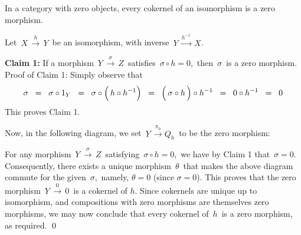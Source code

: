 
\vskip 0.5cm
\begin{lemma}\label{CokernelOfAnIsomorphismIsZero}
\mbox{}
\vskip 0.1cm
\noindent
In a category with zero objects, every cokernel of an isomorphism is a zero morphism.
\end{lemma}
\proof
Let
\,$X \,\overset{h}{\longrightarrow}\, Y$\,
be an isomorphism, with inverse
\,$Y \,\overset{h^{-1}}{\longrightarrow}\, X$.\,

\vskip 0.4cm
\noindent
\textbf{Claim 1:}\quad
If a morphism \,$Y \,\overset{\sigma}{\longrightarrow}\, Z$\, satisfies \,$\sigma \circ h = 0$,\,
then \,$\sigma$\, is a zero morphism.
\vskip 0.2cm
\noindent
Proof of Claim 1:\;\;
Simply observe that
\begin{equation*}
\sigma
\;\; = \;\;
	\sigma \circ 1_{Y}
\;\; = \;\;
	\sigma \circ \left(\,h \overset{{\color{white}!}}{\circ} h^{-1}\right)
\;\; = \;\;
	 \left(\, \sigma \overset{{\color{white}!}}{\circ} h \,\right) \circ h^{-1}
\;\; = \;\;
	 0 \circ h^{-1}
\;\; = \;\;
	 0
\end{equation*}
This proves Claim 1.

\vskip 0.4cm
\noindent
Now, in the following diagram, we set
\,$Y \,\overset{\pi_{h}}{\longrightarrow} Q_{h}$\,
to be the zero morphism:
\begin{center}
\end{center}
For any morphism
\,$Y \,\overset{\sigma}{\longrightarrow}\, Z$\, satisfying \,$\sigma \circ h = 0$,\,
we have by Claim 1 that \,$\sigma = 0$.
Consequently, there exists a unique morphism \,$\theta$\, that makes the above diagram
commute for the given \,$\sigma$,\, namely, $\theta = 0$ (since $\sigma = 0$).
This proves that the zero morphism \,$Y \,\overset{0}{\longrightarrow}\, 0$\, is a cokernel of $h$.
Since cokernels are unique up to isomorphism, and compositions with zero morphisms are themselves zero morphisms,
we may now conclude that every cokernel of \,$h$\, is a zero morphism, as required.
\qed


